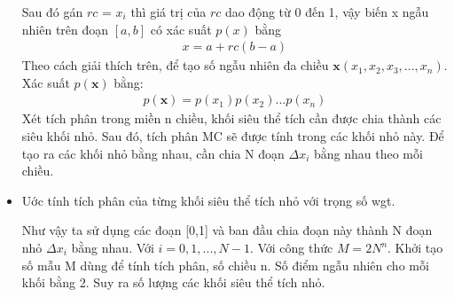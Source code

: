 \begin{itemize}
Sau đó gán $rc$ = $x_i$ thì giá trị của $rc$ dao động từ 0 đến 1, vậy biến x ngẫu nhiên trên đoạn $[a,b]$ có xác suất $p(x)$ bằng
\begin{align}
	x=a+rc(b-a)
\end{align}
Theo cách giải thích trên, để tạo số ngẫu nhiên đa chiều $\textbf{x}(x_1, x_2, x_3, ..., x_n)$. Xác suất $p(\textbf{x})$ bằng: 
\begin{align}
	p(\textbf{x})=p(x_1)p(x_2)...p(x_n)
\end{align}
Xét tích phân trong miền n chiều, khối siêu thể tích cần được chia thành các siêu khối nhỏ.
Sau đó, tích phân MC sẽ được tính trong các khối nhỏ này. 
Để tạo ra các khối nhỏ bằng nhau, cần chia N đoạn ${\Delta}x_i$ bằng nhau theo mỗi chiều.
\item Uớc tính tích phân của từng khối siêu thể tích nhỏ với trọng số wgt.\par
Như vậy ta sử dụng các đoạn [0,1] và ban đầu chia đoạn này thành N đoạn nhỏ ${\Delta}x_i$ bằng nhau. Với $i=0,1, ..., N-1$. 
Với công thức $M=2N^n$. Khởi tạo số mẫu M dùng để tính tích phân, số chiều n. Số điểm ngẫu nhiên cho mỗi khối bằng 2. Suy ra số lượng các khối siêu thể tích nhỏ.

\end{itemize}
